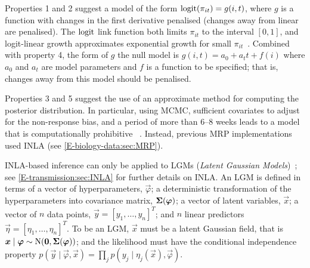 \documentclass[thesis.tex]{subfiles}
\begin{document}
Properties 1 and 2 suggest a model of the form $\operatorname{logit}(\pi_{it}) = g(i, t)$, where $g$ is a function with changes in the first derivative penalised (\ie changes away from linear are penalised).
The $\operatorname{logit}$ link function both limits $\pi_{it}$ to the interval $[0, 1]$, and logit-linear growth approximates exponential growth for small $\pi_{it}$~\autocite{ealesAppropriately}.
Combined with property 4, the form of $g$ the null model is $g(i, t) = a_0 + a_t t + f(i)$ where $a_0$ and $a_t$ are model parameters and $f$ is a function to be specified; that is, changes away from this model should be penalised.



Properties 3 and 5 suggest the use of an approximate method for computing the posterior distribution.
In particular, using MCMC, sufficient covariates to adjust for the non-response bias, and a period of more than 6--8 weeks leads to a model that is computationally prohibitive ~.
Instead, previous MRP implementations used INLA (see \cref{E-biology-data:sec:MRP}).

INLA-based inference can only be applied to LGMs (\emph{Latent Gaussian Models})~\autocite{rueINLAseminar,rueINLA,martinoINLAtutorial}; see \cref{E-transmission:sec:INLA} for further details on INLA.
An LGM is defined in terms of a vector of hyperparameters, $\vec{\varphi}$; a deterministic transformation of the hyperparameters into covariance matrix, $\bm{\Sigma}(\bm{\varphi})$; a vector of latent variables, $\vec{x}$; a vector of $n$ data points, $\vec{y} = [y_1, \dots, y_n]^T$; and $n$ linear predictors $\vec{\eta} = [\eta_1, \dots, \eta_n]^T$.
To be an LGM, $\vec{x}$ must be a latent Gaussian field, that is $\bm{x} \mid \bm{\varphi} \sim \operatorname{N}(\bm{0}, \bm{\Sigma}(\bm{\varphi}))$; and the likelihood must have the conditional independence property $p(\vec{y} \mid \vec{\varphi}, \vec{x}) = \prod_j p(y_j \mid \eta_j(\vec{x}), \vec{\varphi})$.
\end{document}
